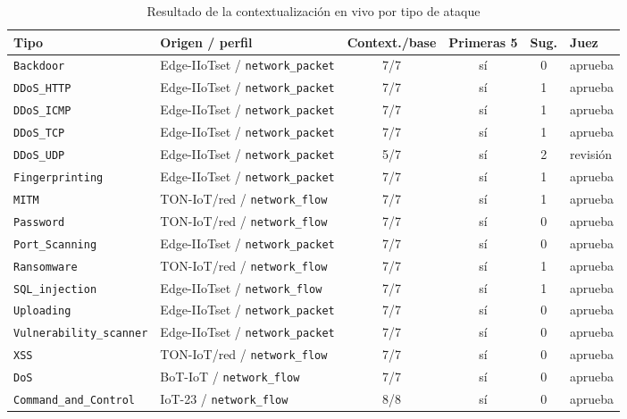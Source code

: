 \begin{table}[H]
    \centering
    \scriptsize
    \caption{Resultado de la contextualización en vivo por tipo de ataque}
    \label{tab:mitigador_mistral_tipo}
    \begin{tabular}{P{3.2cm} P{4.0cm} c c c P{1.8cm}}
        \hline
        \textbf{Tipo} & \textbf{Origen / perfil} &
        \textbf{Context./base} & \textbf{Primeras 5} &
        \textbf{Sug.} & \textbf{Juez} \\
        \hline
        \texttt{Backdoor} & Edge-IIoTset / \texttt{network\_packet} & 7/7 & sí & 0 & aprueba \\
        \hline
        \texttt{DDoS\_HTTP} & Edge-IIoTset / \texttt{network\_packet} & 7/7 & sí & 1 & aprueba \\
        \hline
        \texttt{DDoS\_ICMP} & Edge-IIoTset / \texttt{network\_packet} & 7/7 & sí & 1 & aprueba \\
        \hline
        \texttt{DDoS\_TCP} & Edge-IIoTset / \texttt{network\_packet} & 7/7 & sí & 1 & aprueba \\
        \hline
        \texttt{DDoS\_UDP} & Edge-IIoTset / \texttt{network\_packet} & 5/7 & sí & 2 & revisión \\
        \hline
        \texttt{Fingerprinting} & Edge-IIoTset / \texttt{network\_packet} & 7/7 & sí & 1 & aprueba \\
        \hline
        \texttt{MITM} & TON-IoT/red / \texttt{network\_flow} & 7/7 & sí & 1 & aprueba \\
        \hline
        \texttt{Password} & TON-IoT/red / \texttt{network\_flow} & 7/7 & sí & 0 & aprueba \\
        \hline
        \texttt{Port\_Scanning} & Edge-IIoTset / \texttt{network\_packet} & 7/7 & sí & 0 & aprueba \\
        \hline
        \texttt{Ransomware} & TON-IoT/red / \texttt{network\_flow} & 7/7 & sí & 1 & aprueba \\
        \hline
        \texttt{SQL\_injection} & Edge-IIoTset / \texttt{network\_flow} & 7/7 & sí & 1 & aprueba \\
        \hline
        \texttt{Uploading} & Edge-IIoTset / \texttt{network\_packet} & 7/7 & sí & 0 & aprueba \\
        \hline
        \texttt{Vulnerability\_scanner} & Edge-IIoTset / \texttt{network\_packet} & 7/7 & sí & 0 & aprueba \\
        \hline
        \texttt{XSS} & TON-IoT/red / \texttt{network\_flow} & 7/7 & sí & 0 & aprueba \\
        \hline
        \texttt{DoS} & BoT-IoT / \texttt{network\_flow} & 7/7 & sí & 0 & aprueba \\
        \hline
        \texttt{Command\_and\_Control} & IoT-23 / \texttt{network\_flow} & 8/8 & sí & 0 & aprueba \\
        \hline
    \end{tabular}
\end{table}

